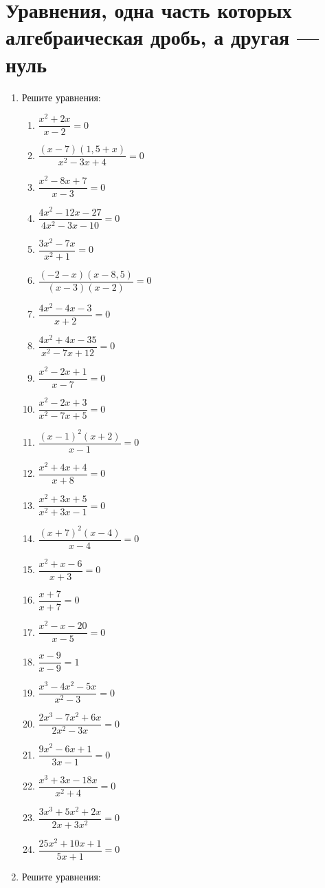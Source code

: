 \documentclass[12pt, a4paper]{article}
\begin{document}
\section{Уравнения, одна часть которых алгебраическая дробь, а другая — нуль}
\begin{enumerate}
	\item Решите уравнения:
	\begin{multicols}{2}
		\begin{enumerate}[label=\asbuk*)]
			\item $\dfrac{x^2+2x}{x-2}=0$
			\item $\dfrac{(x-7)(1,5+x)}{x^2-3x+4}=0$
			\item $\dfrac{x^2-8x+7}{x-3}=0$
			\item $\dfrac{4x^2-12x-27}{4x^2-3x-10}=0$
			\item $\dfrac{3x^2-7x}{x^2+1}=0$
			\item $\dfrac{(-2-x)(x-8,5)}{(x-3)(x-2)}=0$
			\item $\dfrac{4x^2-4x-3}{x+2}=0$
			\item $\dfrac{4x^2+4x-35}{x^2-7x+12}=0$
			\item $\dfrac{x^2-2x+1}{x-7}=0$
			\item $\dfrac{x^2-2x+3}{x^2-7x+5}=0$
			\item $\dfrac{(x-1)^2(x+2)}{x-1}=0$
			\item $\dfrac{x^2+4x+4}{x+8}=0$
			\item $\dfrac{x^2+3x+5}{x^2+3x-1}=0$
			\item $\dfrac{(x+7)^2(x-4)}{x-4}=0$
			\item $\dfrac{x^2+x-6}{x+3}=0$
			\item $\dfrac{x+7}{x+7}=0$
			\item $\dfrac{x^2-x-20}{x-5}=0$
			\item $\dfrac{x-9}{x-9}=1$
			\item $\dfrac{x^3-4x^2-5x}{x^2-3}=0$
			\item $\dfrac{2x^3-7x^2+6x}{2x^2-3x}=0$
			\item $\dfrac{9x^2-6x+1}{3x-1}=0$
			\item $\dfrac{x^3+3x-18x}{x^2+4}=0$
			\item $\dfrac{3x^3+5x^2+2x}{2x+3x^2}=0$
			\item $\dfrac{25x^2+10x+1}{5x+1}=0$
		\end{enumerate}
	\end{multicols}
	\item Решите уравнения:
	\begin{multicols}{2}

\end{multicols}
\end{enumerate}
\end{document}
